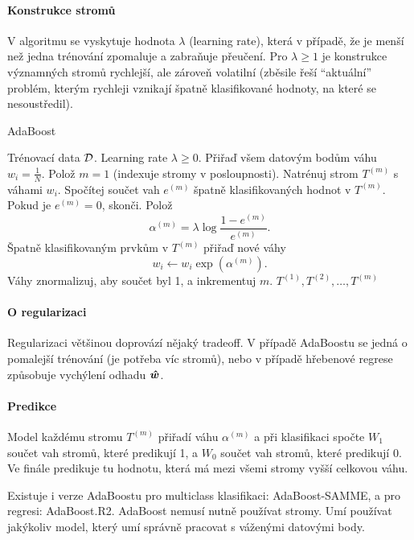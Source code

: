 \documentclass[../main.tex]{subfiles}
\begin{document}
\paragraph{Konstrukce stromů}

V algoritmu se vyskytuje hodnota $\lambda$ (learning rate), která v případě, že je menší než jedna trénování zpomaluje a zabraňuje přeučení. Pro $\lambda \ge 1$ je konstrukce významných stromů rychlejší, ale zároveň volatilní (zběsile řeší ``aktuální'' problém, kterým rychleji vznikají špatně klasifikované hodnoty, na které se nesoustředil).

\begin{algorithm}[H]
    \renewcommand{\thealgorithm}{}
    \caption{AdaBoost}
    \begin{algorithmic}[1]
        \Require
        \Statex Trénovací data $\mathcal{D}$.
        \Statex Learning rate $\lambda \ge 0$.
        \Statex
        \State Přiřaď všem datovým bodům váhu $w_i = \frac{1}{N}$.
        \State Polož $m = 1$ (indexuje stromy v posloupnosti).
        \State Natrénuj strom $T^{(m)}$ s váhami $w_i$.
        \State Spočítej součet vah $e^{(m)}$ špatně klasifikovaných hodnot v $T^{(m)}$.
        \State Pokud je $e^{(m)} = 0$, skonči.
        \State Polož \[\alpha^{(m)} = \lambda \log\frac{1 - e^{(m)}}{e^{(m)}}.\]
        \State Špatně klasifikovaným prvkům v $T^{(m)}$ přiřaď nové váhy
        \[w_i \leftarrow w_i \exp(\alpha^{(m)}).\]
        \State Váhy znormalizuj, aby součet byl 1, a inkrementuj $m$.
        \EndWhile
        \State \Return $T^{(1)}, T^{(2)}, \ldots, T^{(m)}$
    \end{algorithmic}
\end{algorithm}

\paragraph{O regularizaci}

Regularizaci většinou doprovází nějaký tradeoff. V případě AdaBoostu se jedná o pomalejší trénování (je potřeba víc stromů), nebo v případě hřebenové regrese způsobuje vychýlení odhadu $\bm{\hat{w}}$.

\paragraph{Predikce}

Model každému stromu $T^{(m)}$ přiřadí váhu $\alpha^{(m)}$ a při klasifikaci spočte $W_1$ součet vah stromů, které predikují 1, a $W_0$ součet vah stromů, které predikují 0. Ve finále predikuje tu hodnotu, která má mezi všemi stromy vyšší celkovou váhu.

Existuje i verze AdaBoostu pro multiclass klasifikaci: AdaBoost-SAMME, a pro regresi: AdaBoost.R2. AdaBoost nemusí nutně používat stromy. Umí používat jakýkoliv model, který umí správně pracovat s váženými datovými body.
\end{document}
